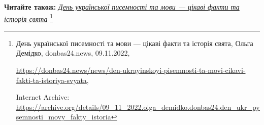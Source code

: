  
 
 
 
 


\textbf{Читайте також:} \href{https://archive.org/details/09_11_2022.olga_demidko.donbas24.den_ukr_pysemnosti_movy_fakty_istoria}{\emph{День української писемності та мови — цікаві факти та історія свята}}%
\footnote{День української писемності та мови — цікаві факти та історія свята, Ольга Демідко, donbas24.news, 09.11.2022, \par%
\url{https://donbas24.news/news/den-ukrayinskoyi-pisemnosti-ta-movi-cikavi-fakti-ta-istoriya-svyata}, \par%
Internet Archive: \url{https://archive.org/details/09_11_2022.olga_demidko.donbas24.den_ukr_pysemnosti_movy_fakty_istoria}%
}
